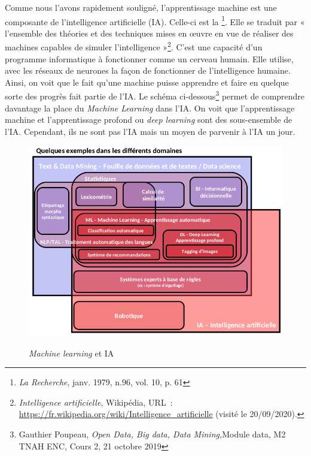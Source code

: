 Comme nous l'avons rapidement souligné, l'apprentissage machine est une composante de l'intelligence artificielle (IA). Celle-ci est la \footnote{\emph{La Recherche}, janv. 1979, n.96, vol. 10, p. 61}. Elle se traduit par  « l'ensemble des théories et des techniques mises en œuvre en vue de réaliser des machines capables de simuler l'intelligence »\footnote{\emph{Intelligence artificielle}, Wikipédia, URL~: \url{https://fr.wikipedia.org/wiki/Intelligence_artificielle} (visité le 20/09/2020).}. C'est une capacité d'un programme informatique à fonctionner comme un cerveau humain. Elle utilise, avec les réseaux de neurones la façon de fonctionner de l'intelligence humaine. Ainsi, on voit que le fait qu'une machine puisse apprendre et faire en quelque sorte des progrès fait partie de l'IA. Le schéma ci-dessous\footnote{Gauthier Poupeau, \emph{Open Data, Big data, Data Mining,}Module data, M2 TNAH ENC, Cours 2, 21 octobre 2019} permet de comprendre davantage la place du \emph{Machine Learning} dans l'IA. On voit que l'apprentissage machine et l'apprentissage profond ou \emph{deep learning} sont des sous-ensemble de l'IA. Cependant, ils ne sont pas l'IA mais un moyen de parvenir à l'IA un jour. 

\begin{figure}[ht]
    \centering
    \caption{\emph{Machine learning} et IA}
    \includegraphics[width=16cm]{images/ia_poupeau.png}
    \label{ia_poupeau}
\end{figure}



